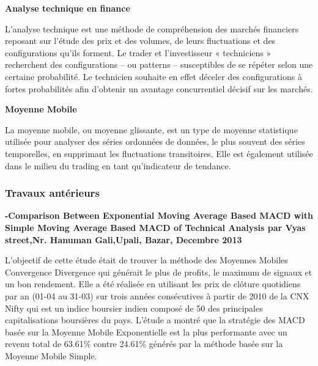 \begin{center}
    \textbf{Analyse technique en finance}
\end{center}
L'analyse technique est une méthode de compréhension des marchés financiers reposant sur l'étude 
des prix et des volumes, de leurs fluctuations et des configurations qu'ils forment. Le trader et 
l'investisseur « techniciens » recherchent des configurations – ou patterns – susceptibles de 
se répéter selon une certaine probabilité. Le technicien souhaite en effet déceler des configurations 
à fortes probabilités afin d'obtenir un avantage concurrentiel décisif sur les marchés.

\begin{center}
    \textbf{Moyenne Mobile}
\end{center}
La moyenne mobile, ou moyenne glissante, est un type de moyenne statistique utilisée pour analyser 
des séries ordonnées de données, le plus souvent des séries temporelles, en supprimant les 
fluctuations transitoires. Elle est également utilisée dans le milieu du trading en tant qu'indicateur 
de tendance.

\subsubsection{Travaux antérieurs}


\textbf{-Comparison Between Exponential Moving Average Based MACD 
with Simple Moving Average Based MACD of Technical Analysis par 
Vyas street,Nr. Hanuman Gali,Upali, Bazar, Decembre 2013}
\par{L'objectif de cette étude était de trouver la méthode des Moyennes 
Mobiles Convergence Divergence qui générait le plus de profits,
le maximum de signaux et un bon rendement. Elle a été réalisée en 
utilisant les prix de clôture quotidiens par an (01-04 au 31-03) sur
trois années consécutives à partir de 2010 de la CNX Nifty qui est un
indice boursier indien composé de 50 des principales capitalisations 
boursières du pays. L'étude a montré que la stratégie des MACD basée sur 
la Moyenne Mobile Exponentielle est la plus performante avec un revenu
total de 63.61\% contre 24.61\% générés par la méthode basée sur la Moyenne 
Mobile Simple.}
        


